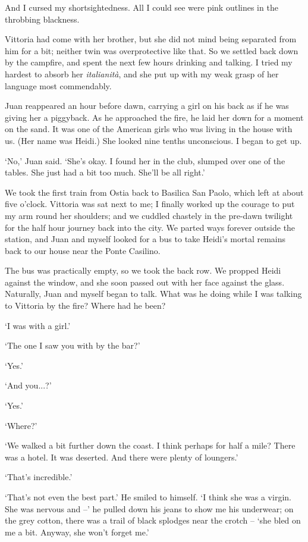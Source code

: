 And I cursed my shortsightedness. All I could see were pink outlines in the throbbing blackness.

Vittoria had come with her brother, but she did not mind being separated from him for a bit; neither twin was overprotective like that. So we settled back down by the campfire, and spent the next few hours drinking and talking. I tried my hardest to absorb her \textit{italianit\`a}, and she put up with my weak grasp of her language most commendably.

Juan reappeared an hour before dawn, carrying a girl on his back as if he was giving her a piggyback. As he approached the fire, he laid her down for a moment on the sand. It was one of the American girls who was living in the house with us. (Her name was Heidi.) She looked nine tenths unconscious. I began to get up.

`No,' Juan said. `She's okay. I found her in the club, slumped over one of the tables. She just had a bit too much. She'll be all right.'

We took the first train from Ostia back to Basilica San Paolo, which left at about five o'clock. Vittoria was sat next to me; I finally worked up the courage to put my arm round her shoulders; and we cuddled chastely in the pre-dawn twilight for the half hour journey back into the city. We parted ways forever outside the station, and Juan and myself looked for a bus to take Heidi's mortal remains back to our house near the Ponte Casilino.

The bus was practically empty, so we took the back row. We propped Heidi against the window, and she soon passed out with her face against the glass. Naturally, Juan and myself began to talk. What was he doing while I was talking to Vittoria by the fire? Where had he been?

`I was with a girl.'

`The one I saw you with by the bar?'

`Yes.'

`And you...?'

`Yes.'

`Where?'

`We walked a bit further down the coast. I think perhaps for half a mile? There was a hotel. It was deserted. And there were plenty of loungers.'

`That's incredible.'

`That's not even the best part.' He smiled to himself. `I think she was a virgin. She was nervous and --' he pulled down his jeans to show me his underwear; on the grey cotton, there was a trail of black splodges near the crotch -- `she bled on me a bit. Anyway, she won't forget me.'

